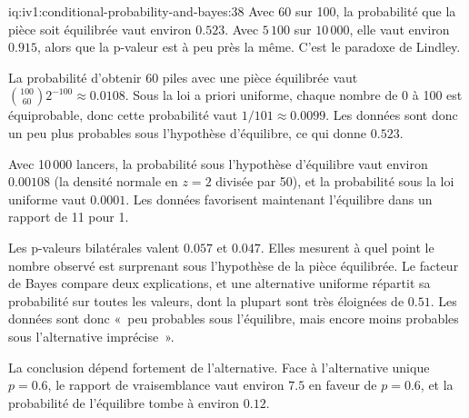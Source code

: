 \begin{solution}{iq:iv1:conditional-probability-and-bayes:38}
Avec 60 sur 100, la probabilité que la pièce soit équilibrée vaut environ $0.523$. Avec $5\,100$ sur $10\,000$, elle vaut environ $0.915$, alors que la p-valeur est à peu près la même. C'est le paradoxe de Lindley.

La probabilité d'obtenir 60 piles avec une pièce équilibrée vaut $\binom{100}{60}2^{-100} \approx 0.0108$. Sous la loi a priori uniforme, chaque nombre de 0 à 100 est équiprobable, donc cette probabilité vaut $1/101 \approx 0.0099$. Les données sont donc un peu plus probables sous l'hypothèse d'équilibre, ce qui donne $0.523$.

Avec 10\,000 lancers, la probabilité sous l'hypothèse d'équilibre vaut environ $0.00108$ (la densité normale en $z = 2$ divisée par 50), et la probabilité sous la loi uniforme vaut $0.0001$. Les données favorisent maintenant l'équilibre dans un rapport de 11 pour 1.

Les p-valeurs bilatérales valent $0.057$ et $0.047$. Elles mesurent à quel point le nombre observé est surprenant sous l'hypothèse de la pièce équilibrée. Le facteur de Bayes compare deux explications, et une alternative uniforme répartit sa probabilité sur toutes les valeurs, dont la plupart sont très éloignées de $0.51$. Les données sont donc «~peu probables sous l'équilibre, mais encore moins probables sous l'alternative imprécise~».

La conclusion dépend fortement de l'alternative. Face à l'alternative unique $p = 0.6$, le rapport de vraisemblance vaut environ $7.5$ en faveur de $p = 0.6$, et la probabilité de l'équilibre tombe à environ $0.12$.

\end{solution}


